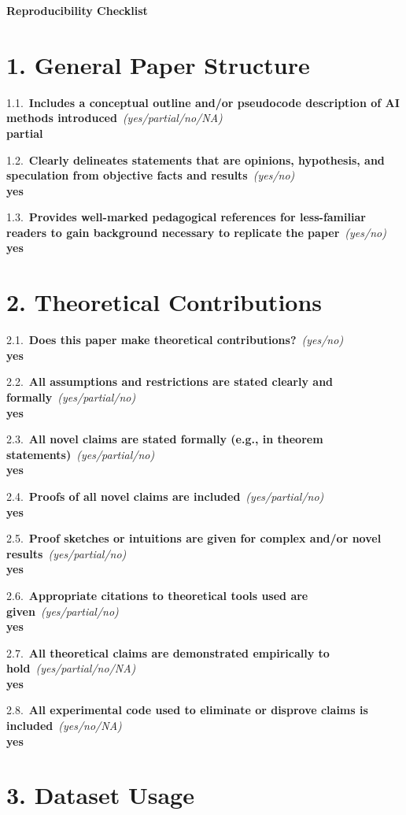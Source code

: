 \documentclass[letterpaper]{article}
\newcommand{\question}[2]{\vspace{6pt}\noindent\textbf{#1}~\textit{#2}\\}
\newcommand{\answer}[1]{\textbf{#1}}
\begin{document}
\begin{center}\Large\textbf{Reproducibility Checklist}\end{center}

\section*{1. General Paper Structure}

1.1.~\question{Includes a conceptual outline and/or pseudocode description of AI
methods introduced}{(yes/partial/no/NA)}
\answer{partial}

1.2.~\question{Clearly delineates statements that are opinions, hypothesis, and
speculation from objective facts and results}{(yes/no)}
\answer{yes}

1.3.~\question{Provides well-marked pedagogical references for less-familiar
readers to gain background necessary to replicate the paper}{(yes/no)}
\answer{yes}

\section*{2. Theoretical Contributions}

2.1.~\question{Does this paper make theoretical contributions?}{(yes/no)}
\answer{yes}

2.2.~\question{All assumptions and restrictions are stated clearly and
formally}{(yes/partial/no)}
\answer{yes}

2.3.~\question{All novel claims are stated formally (e.g., in theorem
statements)}{(yes/partial/no)}
\answer{yes}

2.4.~\question{Proofs of all novel claims are included}{(yes/partial/no)}
\answer{yes}

2.5.~\question{Proof sketches or intuitions are given for complex and/or novel
results}{(yes/partial/no)}
\answer{yes}

2.6.~\question{Appropriate citations to theoretical tools used are
given}{(yes/partial/no)}
\answer{yes}

2.7.~\question{All theoretical claims are demonstrated empirically to
hold}{(yes/partial/no/NA)}
\answer{yes}

2.8.~\question{All experimental code used to eliminate or disprove claims is
included}{(yes/no/NA)}
\answer{yes}

\section*{3. Dataset Usage}
\end{document}
